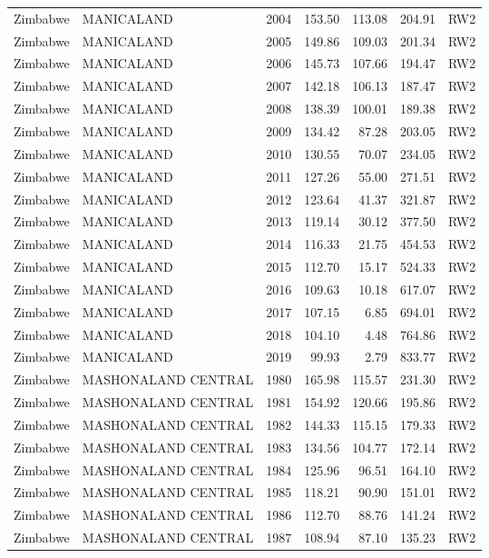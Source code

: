 \begin{longtable}{lllrrrl}
  Zimbabwe & MANICALAND & 2004 & 153.50 & 113.08 & 204.91 & RW2 \\ 
  Zimbabwe & MANICALAND & 2005 & 149.86 & 109.03 & 201.34 & RW2 \\ 
  Zimbabwe & MANICALAND & 2006 & 145.73 & 107.66 & 194.47 & RW2 \\ 
  Zimbabwe & MANICALAND & 2007 & 142.18 & 106.13 & 187.47 & RW2 \\ 
  Zimbabwe & MANICALAND & 2008 & 138.39 & 100.01 & 189.38 & RW2 \\ 
  Zimbabwe & MANICALAND & 2009 & 134.42 & 87.28 & 203.05 & RW2 \\ 
  Zimbabwe & MANICALAND & 2010 & 130.55 & 70.07 & 234.05 & RW2 \\ 
  Zimbabwe & MANICALAND & 2011 & 127.26 & 55.00 & 271.51 & RW2 \\ 
  Zimbabwe & MANICALAND & 2012 & 123.64 & 41.37 & 321.87 & RW2 \\ 
  Zimbabwe & MANICALAND & 2013 & 119.14 & 30.12 & 377.50 & RW2 \\ 
  Zimbabwe & MANICALAND & 2014 & 116.33 & 21.75 & 454.53 & RW2 \\ 
  Zimbabwe & MANICALAND & 2015 & 112.70 & 15.17 & 524.33 & RW2 \\ 
  Zimbabwe & MANICALAND & 2016 & 109.63 & 10.18 & 617.07 & RW2 \\ 
  Zimbabwe & MANICALAND & 2017 & 107.15 & 6.85 & 694.01 & RW2 \\ 
  Zimbabwe & MANICALAND & 2018 & 104.10 & 4.48 & 764.86 & RW2 \\ 
  Zimbabwe & MANICALAND & 2019 & 99.93 & 2.79 & 833.77 & RW2 \\ 
  Zimbabwe & MASHONALAND CENTRAL & 1980 & 165.98 & 115.57 & 231.30 & RW2 \\ 
  Zimbabwe & MASHONALAND CENTRAL & 1981 & 154.92 & 120.66 & 195.86 & RW2 \\ 
  Zimbabwe & MASHONALAND CENTRAL & 1982 & 144.33 & 115.15 & 179.33 & RW2 \\ 
  Zimbabwe & MASHONALAND CENTRAL & 1983 & 134.56 & 104.77 & 172.14 & RW2 \\ 
  Zimbabwe & MASHONALAND CENTRAL & 1984 & 125.96 & 96.51 & 164.10 & RW2 \\ 
  Zimbabwe & MASHONALAND CENTRAL & 1985 & 118.21 & 90.90 & 151.01 & RW2 \\ 
  Zimbabwe & MASHONALAND CENTRAL & 1986 & 112.70 & 88.76 & 141.24 & RW2 \\ 
  Zimbabwe & MASHONALAND CENTRAL & 1987 & 108.94 & 87.10 & 135.23 & RW2 \\ 

\end{longtable}
